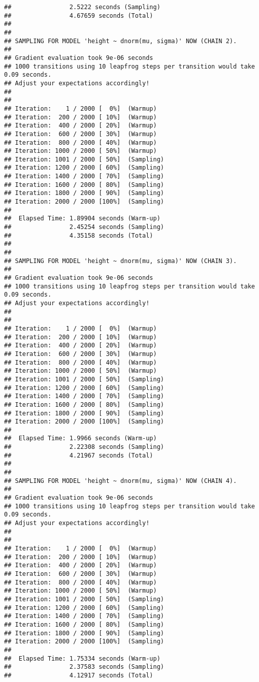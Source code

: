 \documentclass[]{article}
\begin{document}
\begin{verbatim}
##                2.5222 seconds (Sampling)
##                4.67659 seconds (Total)
## 
## 
## SAMPLING FOR MODEL 'height ~ dnorm(mu, sigma)' NOW (CHAIN 2).
## 
## Gradient evaluation took 9e-06 seconds
## 1000 transitions using 10 leapfrog steps per transition would take 0.09 seconds.
## Adjust your expectations accordingly!
## 
## 
## Iteration:    1 / 2000 [  0%]  (Warmup)
## Iteration:  200 / 2000 [ 10%]  (Warmup)
## Iteration:  400 / 2000 [ 20%]  (Warmup)
## Iteration:  600 / 2000 [ 30%]  (Warmup)
## Iteration:  800 / 2000 [ 40%]  (Warmup)
## Iteration: 1000 / 2000 [ 50%]  (Warmup)
## Iteration: 1001 / 2000 [ 50%]  (Sampling)
## Iteration: 1200 / 2000 [ 60%]  (Sampling)
## Iteration: 1400 / 2000 [ 70%]  (Sampling)
## Iteration: 1600 / 2000 [ 80%]  (Sampling)
## Iteration: 1800 / 2000 [ 90%]  (Sampling)
## Iteration: 2000 / 2000 [100%]  (Sampling)
## 
##  Elapsed Time: 1.89904 seconds (Warm-up)
##                2.45254 seconds (Sampling)
##                4.35158 seconds (Total)
## 
## 
## SAMPLING FOR MODEL 'height ~ dnorm(mu, sigma)' NOW (CHAIN 3).
## 
## Gradient evaluation took 9e-06 seconds
## 1000 transitions using 10 leapfrog steps per transition would take 0.09 seconds.
## Adjust your expectations accordingly!
## 
## 
## Iteration:    1 / 2000 [  0%]  (Warmup)
## Iteration:  200 / 2000 [ 10%]  (Warmup)
## Iteration:  400 / 2000 [ 20%]  (Warmup)
## Iteration:  600 / 2000 [ 30%]  (Warmup)
## Iteration:  800 / 2000 [ 40%]  (Warmup)
## Iteration: 1000 / 2000 [ 50%]  (Warmup)
## Iteration: 1001 / 2000 [ 50%]  (Sampling)
## Iteration: 1200 / 2000 [ 60%]  (Sampling)
## Iteration: 1400 / 2000 [ 70%]  (Sampling)
## Iteration: 1600 / 2000 [ 80%]  (Sampling)
## Iteration: 1800 / 2000 [ 90%]  (Sampling)
## Iteration: 2000 / 2000 [100%]  (Sampling)
## 
##  Elapsed Time: 1.9966 seconds (Warm-up)
##                2.22308 seconds (Sampling)
##                4.21967 seconds (Total)
## 
## 
## SAMPLING FOR MODEL 'height ~ dnorm(mu, sigma)' NOW (CHAIN 4).
## 
## Gradient evaluation took 9e-06 seconds
## 1000 transitions using 10 leapfrog steps per transition would take 0.09 seconds.
## Adjust your expectations accordingly!
## 
## 
## Iteration:    1 / 2000 [  0%]  (Warmup)
## Iteration:  200 / 2000 [ 10%]  (Warmup)
## Iteration:  400 / 2000 [ 20%]  (Warmup)
## Iteration:  600 / 2000 [ 30%]  (Warmup)
## Iteration:  800 / 2000 [ 40%]  (Warmup)
## Iteration: 1000 / 2000 [ 50%]  (Warmup)
## Iteration: 1001 / 2000 [ 50%]  (Sampling)
## Iteration: 1200 / 2000 [ 60%]  (Sampling)
## Iteration: 1400 / 2000 [ 70%]  (Sampling)
## Iteration: 1600 / 2000 [ 80%]  (Sampling)
## Iteration: 1800 / 2000 [ 90%]  (Sampling)
## Iteration: 2000 / 2000 [100%]  (Sampling)
## 
##  Elapsed Time: 1.75334 seconds (Warm-up)
##                2.37583 seconds (Sampling)
##                4.12917 seconds (Total)
\end{verbatim}
\end{document}
